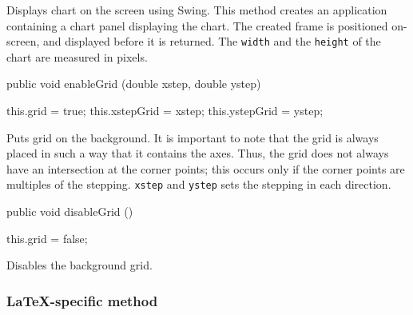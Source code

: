\begin{tabb}
   Displays chart on the screen using Swing.
   This method creates an application containing a chart panel displaying
   the chart. The created frame is positioned on-screen, and displayed before
   it is returned. The \texttt{width} and the \texttt{height}
   of the chart are measured in pixels.
\end{tabb}
\begin{htmlonly}
\end{htmlonly}
\begin{code}

   public void enableGrid (double xstep, double ystep) \begin{hide} {
      this.grid = true;
      this.xstepGrid = xstep;
      this.ystepGrid = ystep;
   }\end{hide}
\end{code}
\begin{tabb}
   Puts grid on the background. It is important to note that the grid is
always placed in such a way that it contains the axes. Thus, the grid does
   not always have an intersection at the corner points; this occurs
   only if the corner points are multiples of the stepping. \texttt{xstep}
   and \texttt{ystep} sets the stepping in each direction.
\end{tabb}
\begin{htmlonly}
\end{htmlonly}
\begin{code}

   public void disableGrid () \begin{hide} {
      this.grid = false;
   }\end{hide}
\end{code}
\begin{tabb}
   Disables the background grid.
\end{tabb}



\subsubsection*{\LaTeX-specific method}


